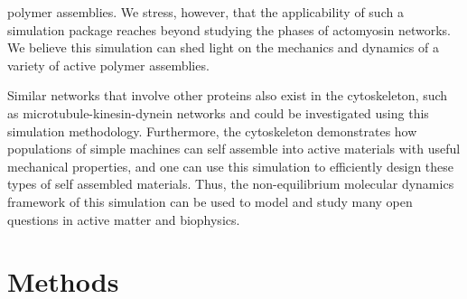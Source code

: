 \documentclass[12pt]{article}
\begin{document}
polymer assemblies. We stress, however, that the applicability of such a
simulation package reaches beyond studying the phases of actomyosin networks.  
We believe this simulation can shed light on the mechanics and dynamics of 
a variety of active polymer assemblies.
\par
Similar networks that involve other proteins also exist in the
cytoskeleton, such as microtubule-kinesin-dynein networks and could be
investigated using this simulation methodology. Furthermore, the cytoskeleton
demonstrates how populations of simple machines can self assemble into active
materials with useful mechanical properties, and one can use this simulation to
efficiently design these types of self assembled materials. Thus, the
non-equilibrium molecular dynamics framework of this simulation can be used to
model and study many open questions in active matter and biophysics.
\section{Methods}  
\end{document}
